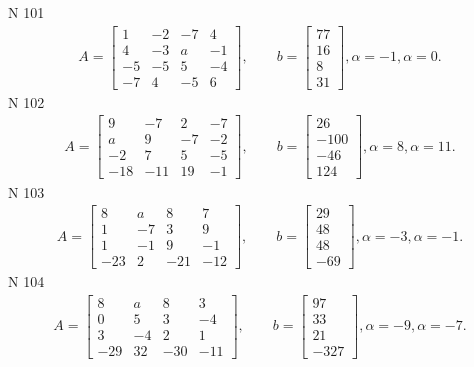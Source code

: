 \documentclass[11pt]{report}
\begin{document}
N 101
\begin{align*}
 A = \left[\begin{matrix}1 & -2 & -7 & 4\\4 & -3 & a & -1\\-5 & -5 & 5 & -4\\-7 & 4 & -5 & 6\end{matrix}\right],
    \qquad b = \left[\begin{matrix}77\\16\\8\\31\end{matrix}\right], \alpha = -1, \alpha = 0. 
 \end{align*}
N 102
\begin{align*}
 A = \left[\begin{matrix}9 & -7 & 2 & -7\\a & 9 & -7 & -2\\-2 & 7 & 5 & -5\\-18 & -11 & 19 & -1\end{matrix}\right],
    \qquad b = \left[\begin{matrix}26\\-100\\-46\\124\end{matrix}\right], \alpha = 8, \alpha = 11. 
 \end{align*}
N 103
\begin{align*}
 A = \left[\begin{matrix}8 & a & 8 & 7\\1 & -7 & 3 & 9\\1 & -1 & 9 & -1\\-23 & 2 & -21 & -12\end{matrix}\right],
    \qquad b = \left[\begin{matrix}29\\48\\48\\-69\end{matrix}\right], \alpha = -3, \alpha = -1. 
 \end{align*}
N 104
\begin{align*}
 A = \left[\begin{matrix}8 & a & 8 & 3\\0 & 5 & 3 & -4\\3 & -4 & 2 & 1\\-29 & 32 & -30 & -11\end{matrix}\right],
    \qquad b = \left[\begin{matrix}97\\33\\21\\-327\end{matrix}\right], \alpha = -9, \alpha = -7. 
 \end{align*}
\end{document}
